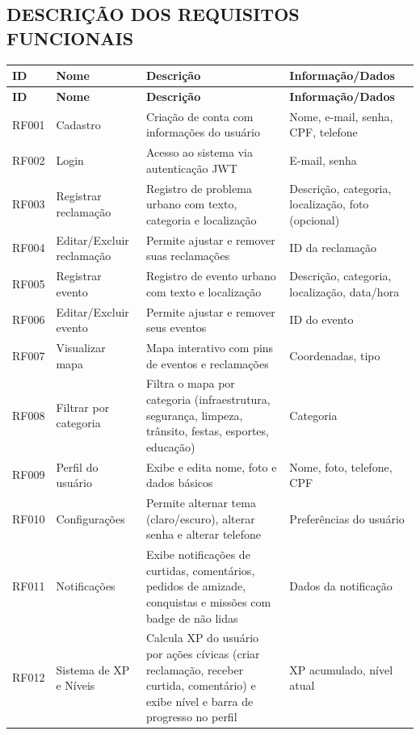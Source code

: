 \subsection{DESCRIÇÃO DOS REQUISITOS FUNCIONAIS}

\begin{longtable}{|p{1.5cm}|p{3cm}|p{6cm}|p{3.5cm}|}
  \hline
  \textbf{ID} & \textbf{Nome} & \textbf{Descrição} & \textbf{Informação/Dados} \\
  \hline
  \endfirsthead
  \hline
  \textbf{ID} & \textbf{Nome} & \textbf{Descrição} & \textbf{Informação/Dados} \\
  \hline
  \endhead
  RF001 & Cadastro & Criação de conta com informações do usuário & Nome, e-mail, senha, CPF, telefone \\
  \hline
  RF002 & Login & Acesso ao sistema via autenticação JWT & E-mail, senha \\
  \hline
  RF003 & Registrar reclamação & Registro de problema urbano com texto, categoria e localização & Descrição, categoria, localização, foto (opcional) \\
  \hline
  RF004 & Editar/Excluir reclamação & Permite ajustar e remover suas reclamações & ID da reclamação \\
  \hline
  RF005 & Registrar evento & Registro de evento urbano com texto e localização & Descrição, categoria, localização, data/hora \\
  \hline
  RF006 & Editar/Excluir evento & Permite ajustar e remover seus eventos & ID do evento \\
  \hline
  RF007 & Visualizar mapa & Mapa interativo com pins de eventos e reclamações & Coordenadas, tipo \\
  \hline
  RF008 & Filtrar por categoria & Filtra o mapa por categoria (infraestrutura, segurança, limpeza, trânsito, festas, esportes, educação) & Categoria \\
  \hline
  RF009 & Perfil do usuário & Exibe e edita nome, foto e dados básicos & Nome, foto, telefone, CPF \\
  \hline
  RF010 & Configurações & Permite alternar tema (claro/escuro), alterar senha e alterar telefone & Preferências do usuário \\
  \hline
  RF011 & Notificações & Exibe notificações de curtidas, comentários, pedidos de amizade, conquistas e missões com badge de não lidas & Dados da notificação \\
  \hline
  RF012 & Sistema de XP e Níveis & Calcula XP do usuário por ações cívicas (criar reclamação, receber curtida, comentário) e exibe nível e barra de progresso no perfil & XP acumulado, nível atual \\

\end{longtable}
